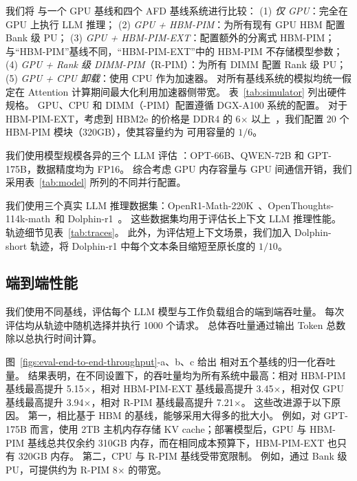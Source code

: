 我们将 \sys 与一个 GPU 基线和四个 AFD 基线系统进行比较：
(1) \emph{仅 GPU}：完全在 GPU 上执行 LLM 推理；
(2) \emph{GPU + HBM-PIM}：为所有现有 GPU HBM 配置 Bank 级 PU；
(3) \emph{GPU + HBM-PIM-EXT}：配置额外的分离式 HBM-PIM；与“HBM-PIM”基线不同，“HBM-PIM-EXT”中的 HBM-PIM 不存储模型参数；
(4) \emph{GPU + Rank 级 DIMM-PIM}（R-PIM）：为所有 DIMM 配置 Rank 级 PU；
(5) \emph{GPU + CPU 卸载}：使用 CPU 作为加速器。
对所有基线系统的模拟均统一假定在 Attention 计算期间最大化利用加速器侧带宽。
表~\ref{tab:simulator} 列出硬件规格。
GPU、CPU 和 DIMM（-PIM）配置遵循 DGX-A100 系统的配置。
对于 HBM-PIM-EXT，考虑到 HBM2e 的价格是 DDR4 的 6$\times$ 以上~\cite{cost-ddr5-hbm,cost-ddr4,cost-ddr5}，我们配置 20 个 HBM-PIM 模块（320GB），使其容量约为 \sys 可用容量的 $1/6$。

我们使用模型规模各异的三个 LLM 评估 \sys：OPT-66B、QWEN-72B 和 GPT-175B，数据精度均为 FP16。
综合考虑 GPU 内存容量与 GPU 间通信开销，我们采用表~\ref{tab:model} 所列的不同并行配置。

我们使用三个真实 LLM 推理数据集：OpenR1-Math-220K~\cite{open-r1}、OpenThoughts-114k-math~\cite{OpenThoughts-114k-math}和 Dolphin-r1~\cite{dophin}。
这些数据集均用于评估长上下文 LLM 推理性能。
轨迹细节见表~\ref{tab:traces}。
此外，为评估短上下文场景，我们加入 Dolphin-short 轨迹，将 Dolphin-r1 中每个文本条目缩短至原长度的 $1/10$。

\subsection{端到端性能}
\label{sec:eval-end-to-end}
我们使用不同基线，评估每个 LLM 模型与工作负载组合的端到端吞吐量。
每次评估均从轨迹中随机选择并执行 1000 个请求。
总体吞吐量通过输出 Token 总数除以总执行时间计算。

\label{sec:eval-e2e-throughputs}
图~\ref{figs:eval-end-to-end-throughput}-a、b、c 给出 \sys 相对五个基线的归一化吞吐量。
结果表明，在不同设置下，\sys 的吞吐量均为所有系统中最高：相对 HBM-PIM 基线最高提升 5.15$\times$，相对 HBM-PIM-EXT 基线最高提升 3.45$\times$，相对仅 GPU 基线最高提升 3.94$\times$，相对 R-PIM 基线最高提升 7.21$\times$。
这些改进源于以下原因。
第一，相比基于 HBM 的基线，\sys 能够采用大得多的批大小。
例如，对 GPT-175B 而言，\sys 使用 2TB 主机内存存储 KV cache；部署模型后，GPU 与 HBM-PIM 基线总共仅余约 310GB 内存，而在相同成本预算下，HBM-PIM-EXT 也只有 320GB 内存。
第二，CPU 与 R-PIM 基线受带宽限制。
例如，通过 Bank 级 PU，\sys 可提供约为 R-PIM 8$\times$ 的带宽。

